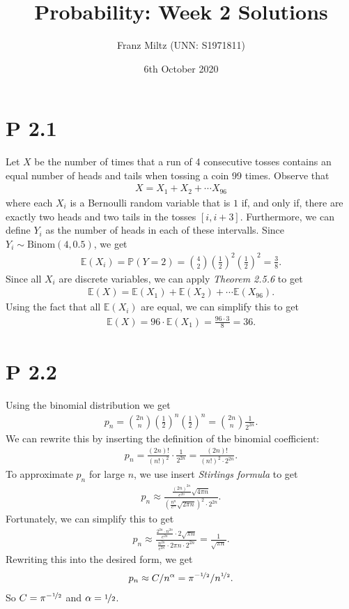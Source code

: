 \documentclass{article}
\renewcommand{\P}{\mathbb{P}}
\newcommand{\E}{\mathbb{E}}
\begin{document}
\title{Probability: Week 2 Solutions}
\author{Franz Miltz (UNN: S1971811)}
\date{6th October 2020}
\maketitle
\section*{P 2.1}
Let $X$ be the number of times that a run of 4 consecutive tosses
contains an equal number of heads and tails when tossing a coin 99 times.
Observe that
\begin{align*}
  X=X_1 + X_2 + \cdots X_{96}
\end{align*}
where each $X_i$ is a Bernoulli random variable that is $1$ if, 
and only if, there are exactly two heads and two tails in the tosses
$[i, i+3]$. Furthermore, we can define $Y_i$ as the number of heads
in each of these intervalls. Since $Y_i\sim \text{Binom}(4,0.5)$,
we get
\begin{align*}
  \E(X_i) = \P(Y=2) = \binom{4}{2}\left(\frac{1}{2}\right)^2\left(\frac{1}{2}\right)^2=\frac{3}{8}.
\end{align*}
Since all $X_i$ are discrete variables, we can apply \emph{Theorem 2.5.6}
to get
\begin{align*}
  \E(X) = \E(X_1) + \E(X_2) + \cdots \E(X_{96}).
\end{align*}
Using the fact that all $\E(X_i)$ are equal, we can simplify this to get
\begin{align*}
  \E(X) = 96\cdot\E(X_1) = \frac{96\cdot3}{8}=36.
\end{align*}
\section*{P 2.2}
Using the binomial distribution we get
\begin{align*}
  p_n = \binom{2n}{n}\left(\frac{1}{2}\right)^n\left(\frac{1}{2}\right)^n
  =\binom{2n}{n}\frac{1}{2^{2n}}.
\end{align*}
We can rewrite this by inserting the definition of the binomial
coefficient:
\begin{align*}
  p_n = \frac{(2n)!}{(n!)^2}\cdot\frac{1}{2^{2n}}=\frac{(2n)!}{(n!)^2\cdot 2^{2n}}.
\end{align*}
To approximate $p_n$ for large $n$, we use insert \emph{Stirlings formula}
to get
\begin{align*}
  p_n \approx \frac{
    \frac{(2n)^{2n}}{e^{2n}}\sqrt{4\pi n}
  }{
    \left(\frac{n^n}{e^n}\sqrt{2\pi n}\right)^2\cdot 2^{2n}}.
\end{align*}
Fortunately, we can simplify this to get
\begin{align*}
  p_n\approx \frac{
    \frac{2^{2n}\cdot n^{2n}}{e^{2n}}\cdot2\sqrt{\pi n}
  }{
    \frac{n^{2n}}{e^{2n}}\cdot 2\pi n\cdot 2^{2n}}=\frac{1}{\sqrt{\pi n}}.
\end{align*}
Rewriting this into the desired form, we get
\begin{align*}
  p_n\approx C / n^\alpha = \pi^{-\nicefrac{1}{2}}/n^{\nicefrac{1}{2}}.
\end{align*}
So $C=\pi^{-\nicefrac{1}{2}}$ and $\alpha=\nicefrac{1}{2}$.
\end{document}
